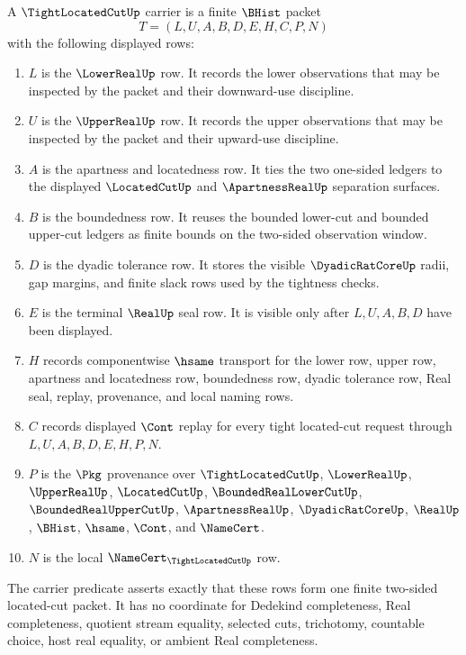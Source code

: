 \begin{definition}
\label{def:tight-located-cut-carrier}
A $\TightLocatedCutUp$ carrier is a finite $\BHist$ packet
$$
T=(L,U,A,B,D,E,H,C,P,N)
$$
with the following displayed rows:
\begin{enumerate}
\item $L$ is the $\LowerRealUp$ row. It records the lower observations that may be inspected by the packet and their downward-use discipline.
\item $U$ is the $\UpperRealUp$ row. It records the upper observations that may be inspected by the packet and their upward-use discipline.
\item $A$ is the apartness and locatedness row. It ties the two one-sided ledgers to the displayed $\LocatedCutUp$ and $\ApartnessRealUp$ separation surfaces.
\item $B$ is the boundedness row. It reuses the bounded lower-cut and bounded upper-cut ledgers as finite bounds on the two-sided observation window.
\item $D$ is the dyadic tolerance row. It stores the visible $\DyadicRatCoreUp$ radii, gap margins, and finite slack rows used by the tightness checks.
\item $E$ is the terminal $\RealUp$ seal row. It is visible only after $L,U,A,B,D$ have been displayed.
\item $H$ records componentwise $\hsame$ transport for the lower row, upper row, apartness and locatedness row, boundedness row, dyadic tolerance row, Real seal, replay, provenance, and local naming rows.
\item $C$ records displayed $\Cont$ replay for every tight located-cut request through $L,U,A,B,D,E,H,P,N$.
\item $P$ is the $\Pkg$ provenance over $\TightLocatedCutUp$, $\LowerRealUp$, $\UpperRealUp$, $\LocatedCutUp$, $\BoundedRealLowerCutUp$, $\BoundedRealUpperCutUp$, $\ApartnessRealUp$, $\DyadicRatCoreUp$, $\RealUp$, $\BHist$, $\hsame$, $\Cont$, and $\NameCert$.
\item $N$ is the local $\NameCert_{\TightLocatedCutUp}$ row.
\end{enumerate}
The carrier predicate asserts exactly that these rows form one finite two-sided located-cut packet. It has no coordinate for Dedekind completeness, Real completeness, quotient stream equality, selected cuts, trichotomy, countable choice, host real equality, or ambient Real completeness.
\end{definition}

